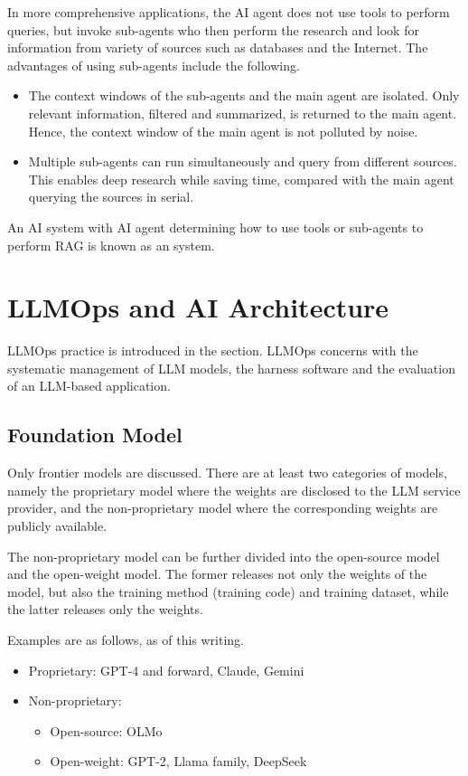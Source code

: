 In more comprehensive applications, the AI agent does not use tools to perform queries, but invoke sub-agents who then perform the research and look for information from variety of sources such as databases and the Internet. The advantages of using sub-agents include the following.
\begin{itemize}
  \item The context windows of the sub-agents and the main agent are isolated. Only relevant information, filtered and summarized, is returned to the main agent. Hence, the context window of the main agent is not polluted by noise.
  \item Multiple sub-agents can run simultaneously and query from different sources. This enables deep research while saving time, compared with the main agent querying the sources in serial.
\end{itemize}

An AI system with AI agent determining how to use tools or sub-agents to perform RAG is known as an  system.

\section{LLMOps and AI Architecture}

LLMOps practice is introduced in the section. LLMOps concerns with the systematic management of LLM models, the harness software and the evaluation of an LLM-based application.

\subsection{Foundation Model}

Only frontier models are discussed. There are at least two categories of models, namely the proprietary model where the weights are disclosed to the LLM service provider, and the non-proprietary model where the corresponding weights are publicly available.

The non-proprietary model can be further divided into the open-source model and the open-weight model. The former releases not only the weights of the model, but also the training method (training code) and training dataset, while the latter releases only the weights.

Examples are as follows, as of this writing.
\begin{itemize}
  \item Proprietary: GPT-4 and forward, Claude, Gemini
  \item Non-proprietary:
  \begin{itemize}
    \item Open-source: OLMo
    \item Open-weight: GPT-2, Llama family, DeepSeek
  \end{itemize}
\end{itemize}

